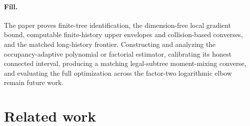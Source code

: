 \documentclass{article}
\begin{document}
\paragraph{Fill.} The paper proves finite-tree identification, the dimension-free local gradient bound, computable finite-history upper envelopes and collision-based converses, and the matched long-history frontier. Constructing and analyzing the occupancy-adaptive polynomial or factorial estimator, calibrating its honest connected interval, producing a matching legal-subtree moment-mixing converse, and evaluating the full optimization across the factor-two logarithmic elbow remain future work.

\section{Related work}
\end{document}
